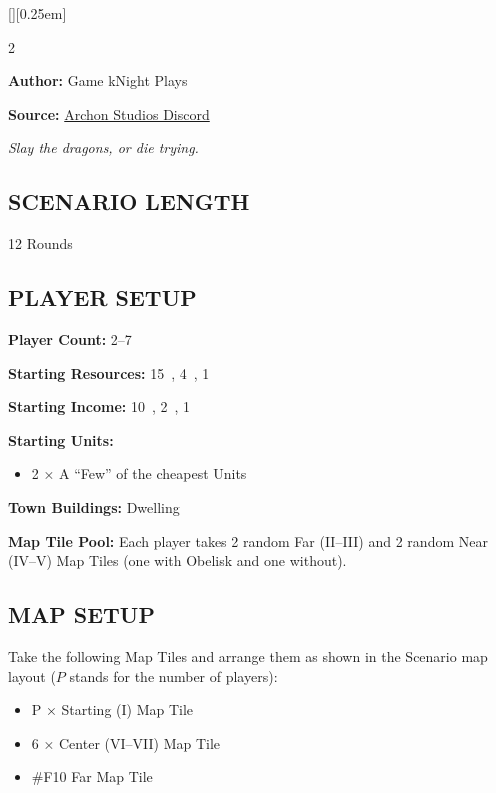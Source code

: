 [][0.25em]

\begin{multicols}{2}

\textbf{Author:} Game kNight Plays


\textbf{Source:} \href{https://discord.com/channels/740870068178649108/1248684870696304660}{Archon Studios Discord}

\textit{Slay the dragons, or die trying.}  %

\subsection*{\MakeUppercase{Scenario Length}}
12 Rounds

\subsection*{\MakeUppercase{Player Setup}}
\textbf{Player Count:} 2--7

\textbf{Starting Resources:} 15~, 4~, 1~

\textbf{Starting Income:} 10~, 2~, 1~

\textbf{Starting Units:}

\begin{itemize}
  \item 2 × A ``Few'' of the cheapest  Units
\end{itemize}

\textbf{Town Buildings:}  Dwelling

\textbf{Map Tile Pool:} Each player takes 2 random Far (II–III) and 2 random Near (IV–V) Map Tiles (one with Obelisk and one without).

\subsection*{\MakeUppercase{Map Setup}}
Take the following Map Tiles and arrange them as shown in the Scenario map layout ($P$ stands for the number of players):

\begin{itemize}
  \item P × Starting (I) Map Tile
  \item 6 × Center (VI–VII) Map Tile
  \item \#F10 Far Map Tile
\end{itemize}


\end{multicols}

